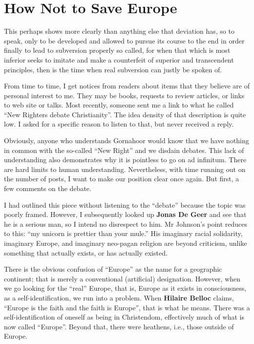 \section{How Not to Save Europe}

\begin{quotex}
This perhaps shows more clearly than anything else that deviation has, so to speak, only to be developed and allowed to pursue its course to the end in order finally to lead to subversion properly so called, for when that which is most inferior seeks to imitate and make a counterfeit of superior and transcendent principles, then is the time when real subversion can justly be spoken of.
\end{quotex}


From time to time, I get notices from readers about items that they believe are of personal interest to me. They may be books, requests to review articles, or links to web site or talks. Most recently, someone sent me a link to what he called ``New Righters debate Christianity''. The idea density of that description is quite low. I asked for a specific reason to listen to that, but never received a reply.

Obviously, anyone who understands Gornahoor would know that we have nothing in common with the so-called ``New Right'' and we disdain debates. This lack of understanding also demonstrates why it is pointless to go on ad infinitum. There are hard limits to human understanding. Nevertheless, with time running out on the number of posts, I want to make our position clear once again. But first, a few comments on the debate.

I had outlined this piece without listening to the ``debate'' because the topic was poorly framed. However, I subsequently looked up \textbf{Jonas De Geer} and see that he is a serious man, so I intend no disrespect to him. Mr Johnson's point reduces to this: ``my unicorn is prettier than your mule.'' His imaginary racial solidarity, imaginary Europe, and imaginary neo-pagan religion are beyond criticism, unlike something that actually exists, or has actually existed.

There is the obvious confusion of ``Europe'' as the name for a geographic continent; that is merely a conventional (artificial) designation. However, when we go looking for the ``real'' Europe, that is, Europe as it exists in consciousness, as a self-identification, we run into a problem. When \textbf{Hilaire Belloc} claims, ``Europe is the faith and the faith is Europe'', that is what he means. There was a self-identification of oneself as being in Christendom, effectively much of what is now called ``Europe''. Beyond that, there were heathens, i.e., those outside of Europe.

